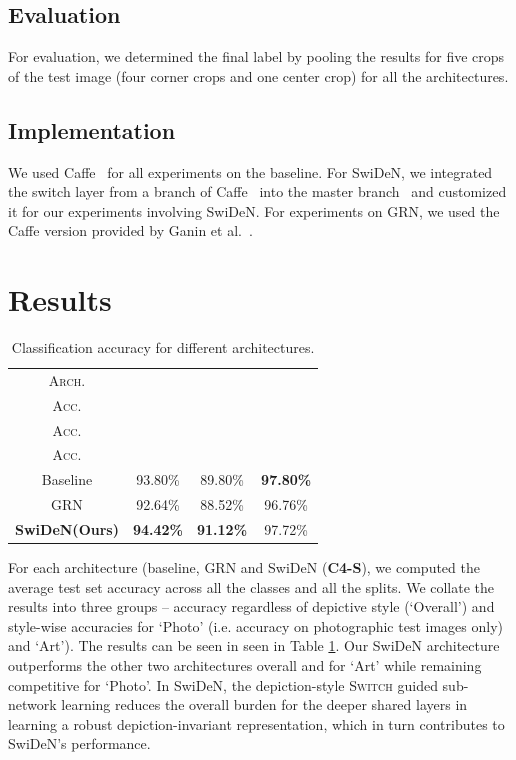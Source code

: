\documentclass[preprint]{sig-alternate-05-2015}
\begin{document}
\subsection{Evaluation}
For evaluation, we determined the final label by  pooling the results for five crops of the test image (four corner crops and one center crop) for all the architectures.

\subsection{Implementation}
 We used Caffe~\cite{jia2014caffe} for all experiments on the baseline. For SwiDeN, we integrated the switch layer from a branch of Caffe~\cite{caffe-dev} into the master branch~\cite{caffe-master} and customized it for our experiments involving SwiDeN. For experiments on GRN, we used the Caffe version provided by  Ganin et al.~\cite{ganin2015unsupervised}. 
 
\section{Results}
\label{sec:results}

\renewcommand{\arraystretch}{1.5}
\begin{table}[!tbp]
\centering
\footnotesize
\begin{tabular}{|c|c|c|c|}
\hline
\textsc{Arch.} & \thead{\textsc{Overall} \\ \textsc{Acc.}} & \thead{\textsc{Art} \\ \textsc{Acc.}} & \thead{\textsc{Photo} \\ \textsc{Acc.}} \\
\hline
\hline 
 Baseline & 93.80\% & 89.80\% & \textbf{97.80\%} \\
\hline
GRN & 92.64\% & 88.52\%  & 96.76\% \\
\hline
\textbf{SwiDeN(Ours)} & \textbf{94.42\%} & \textbf{91.12\%} & 97.72\% \\
\hline
\end{tabular}
\caption{Classification accuracy for different architectures.}
\label{tab:accuracy}
\end{table}

For each architecture (baseline, GRN and SwiDeN (\textbf{C4-S}), we computed the average test set accuracy across all the classes and all the splits. We collate the results into three groups -- accuracy regardless of depictive style (`Overall') and style-wise accuracies for `Photo' (i.e. accuracy on photographic test images only) and `Art'). The results can be seen in seen in Table \ref{tab:accuracy}. Our SwiDeN architecture outperforms the other two architectures overall and for `Art' while remaining competitive for `Photo'. In SwiDeN, the depiction-style \textsc{Switch} guided sub-network learning reduces the overall burden for the deeper shared layers in learning a robust depiction-invariant representation, which in turn contributes to SwiDeN's performance. 
\end{document}
